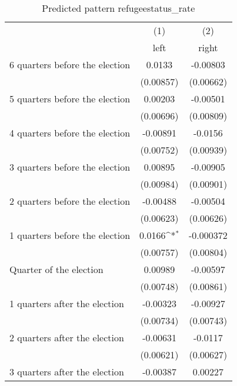 \begin{table}[htbp]\centering
\def\sym#1{\ifmmode^{#1}\else\(^{#1}\)\fi}
\caption{Predicted pattern refugeestatus\_rate}
\begin{tabular}{l*{2}{c}}
\hline\hline
                    &\multicolumn{1}{c}{(1)}&\multicolumn{1}{c}{(2)}\\
                    &\multicolumn{1}{c}{left}&\multicolumn{1}{c}{right}\\
\hline
 6 quarters before the election&      0.0133         &    -0.00803         \\
                    &   (0.00857)         &   (0.00662)         \\
[1em]
 5 quarters before the election&     0.00203         &    -0.00501         \\
                    &   (0.00696)         &   (0.00809)         \\
[1em]
 4 quarters before the election&    -0.00891         &     -0.0156         \\
                    &   (0.00752)         &   (0.00939)         \\
[1em]
 3 quarters before the election&     0.00895         &    -0.00905         \\
                    &   (0.00984)         &   (0.00901)         \\
[1em]
 2 quarters before the election&    -0.00488         &    -0.00504         \\
                    &   (0.00623)         &   (0.00626)         \\
[1em]
 1 quarters before the election&      0.0166\sym{*}  &   -0.000372         \\
                    &   (0.00757)         &   (0.00804)         \\
[1em]
Quarter of the election&     0.00989         &    -0.00597         \\
                    &   (0.00748)         &   (0.00861)         \\
[1em]
 1 quarters after the election&    -0.00323         &    -0.00927         \\
                    &   (0.00734)         &   (0.00743)         \\
[1em]
 2 quarters after the election&    -0.00631         &     -0.0117         \\
                    &   (0.00621)         &   (0.00627)         \\
[1em]
 3 quarters after the election&    -0.00387         &     0.00227         \\

\end{tabular}
\end{table}
